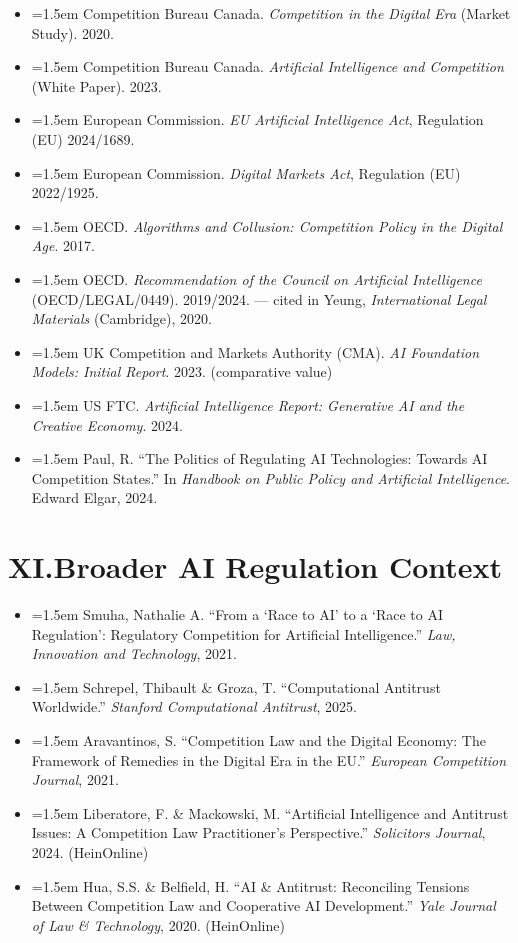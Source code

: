 \documentclass[12pt, letterpaper]{article}
\newcommand{\entry}[1]{%
  \item \hangindent=1.5em \hangafter=1 #1%
}
\begin{document}
\begin{itemize}
\entry{Competition Bureau Canada. \textit{Competition in the Digital Era} (Market Study). 2020.}
\entry{Competition Bureau Canada. \textit{Artificial Intelligence and Competition} (White Paper). 2023.}
\entry{European Commission. \textit{EU Artificial Intelligence Act}, Regulation (EU) 2024/1689.}
\entry{European Commission. \textit{Digital Markets Act}, Regulation (EU) 2022/1925.}
\entry{OECD. \textit{Algorithms and Collusion: Competition Policy in the Digital Age}. 2017.}
\entry{OECD. \textit{Recommendation of the Council on Artificial Intelligence} (OECD/LEGAL/0449). 2019/2024. --- cited in Yeung, \textit{International Legal Materials} (Cambridge), 2020.}
\entry{UK Competition and Markets Authority (CMA). \textit{AI Foundation Models: Initial Report}. 2023. (comparative value)}
\entry{US FTC. \textit{Artificial Intelligence Report: Generative AI and the Creative Economy}. 2024.}
\entry{Paul, R. ``The Politics of Regulating AI Technologies: Towards AI Competition States.'' In \textit{Handbook on Public Policy and Artificial Intelligence}. Edward Elgar, 2024.}
\end{itemize}

\section{XI.\quad Broader AI Regulation Context}

\begin{itemize}
\entry{Smuha, Nathalie A. ``From a `Race to AI' to a `Race to AI Regulation': Regulatory Competition for Artificial Intelligence.'' \textit{Law, Innovation and Technology}, 2021.}
\entry{Schrepel, Thibault \& Groza, T. ``Computational Antitrust Worldwide.'' \textit{Stanford Computational Antitrust}, 2025.}
\entry{Aravantinos, S. ``Competition Law and the Digital Economy: The Framework of Remedies in the Digital Era in the EU.'' \textit{European Competition Journal}, 2021.}
\entry{Liberatore, F. \& Mackowski, M. ``Artificial Intelligence and Antitrust Issues: A Competition Law Practitioner's Perspective.'' \textit{Solicitors Journal}, 2024. (HeinOnline)}
\entry{Hua, S.S. \& Belfield, H. ``AI \& Antitrust: Reconciling Tensions Between Competition Law and Cooperative AI Development.'' \textit{Yale Journal of Law \& Technology}, 2020. (HeinOnline)}
\end{itemize}
\end{document}
